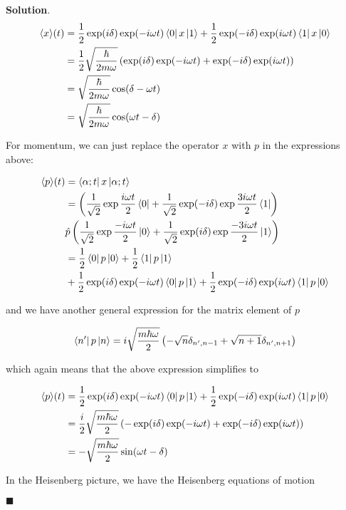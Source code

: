 \documentclass[12pt]{article}
\theoremstyle{definition}
\newenvironment{s}{%
        \begin{trivlist} \item \textbf{Solution}. }{%
            \hspace*{\fill} $\blacksquare$\end{trivlist}}%
\begin{document}
{\begin{s}
\begin{align*}
\langle x\rangle(t) &= \frac{1}{2}\exp(i\delta)\exp(-i\omega t)\bra{0}x\ket{1} + \frac{1}{2}\exp(-i\delta)\exp(i\omega t)\bra{1}x\ket{0}\\
&= \frac{1}{2}\sqrt{\frac{\hbar}{2m\omega}}\left(\exp(i\delta)\exp(-i\omega t)+\exp(-i\delta)\exp(i\omega t)\right)\\
&= \sqrt{\frac{\hbar}{2m\omega}}\cos(\delta-\omega t)\\
&= \sqrt{\frac{\hbar}{2m\omega}}\cos(\omega t-\delta)
\end{align*}

For momentum, we can just replace the operator $x$ with $p$ in the expressions above:

\begin{align*}
\langle p\rangle(t) &= \bra{\alpha;t}x\ket{\alpha;t}\\
&= \left(\frac{1}{\sqrt{2}}\exp\frac{i\omega t}{2}\bra{0} + \frac{1}{\sqrt{2}}\exp(-i\delta)\exp\frac{3i\omega t}{2}\bra{1}\right) \\
&\hat{p} \left(\frac{1}{\sqrt{2}}\exp\frac{-i\omega t}{2}\ket{0} + \frac{1}{\sqrt{2}}\exp(i\delta)\exp\frac{-3i\omega t}{2}\ket{1}\right)\\
&= \frac{1}{2}\bra{0}p\ket{0} + \frac{1}{2}\bra{1}p\ket{1} \\
&+ \frac{1}{2}\exp(i\delta)\exp(-i\omega t)\bra{0}p\ket{1} + \frac{1}{2}\exp(-i\delta)\exp(i\omega t)\bra{1}p\ket{0}
\end{align*}

and we have another general expression for the matrix element of $p$

\begin{align*}
\bra{n'}p\ket{n} = i\sqrt{\frac{m\hbar\omega}{2}}\left(-\sqrt{n}\delta_{n',n-1} +\sqrt{n+1}\delta_{n',n+1}\right)
\end{align*}

which again means that the above expression simplifies to 

\begin{align*}
\langle p\rangle(t) &= \frac{1}{2}\exp(i\delta)\exp(-i\omega t)\bra{0}p\ket{1} + \frac{1}{2}\exp(-i\delta)\exp(i\omega t)\bra{1}p\ket{0}\\
&= \frac{i}{2}\sqrt{\frac{m\hbar\omega}{2}}\left(-\exp(i\delta)\exp(-i\omega t)+\exp(-i\delta)\exp(i\omega t)\right)\\
&= -\sqrt{\frac{m\hbar\omega}{2}}\sin(\omega t - \delta)
\end{align*}

In the Heisenberg picture, we have the Heisenberg equations of motion


\end{s}}
\end{document}
